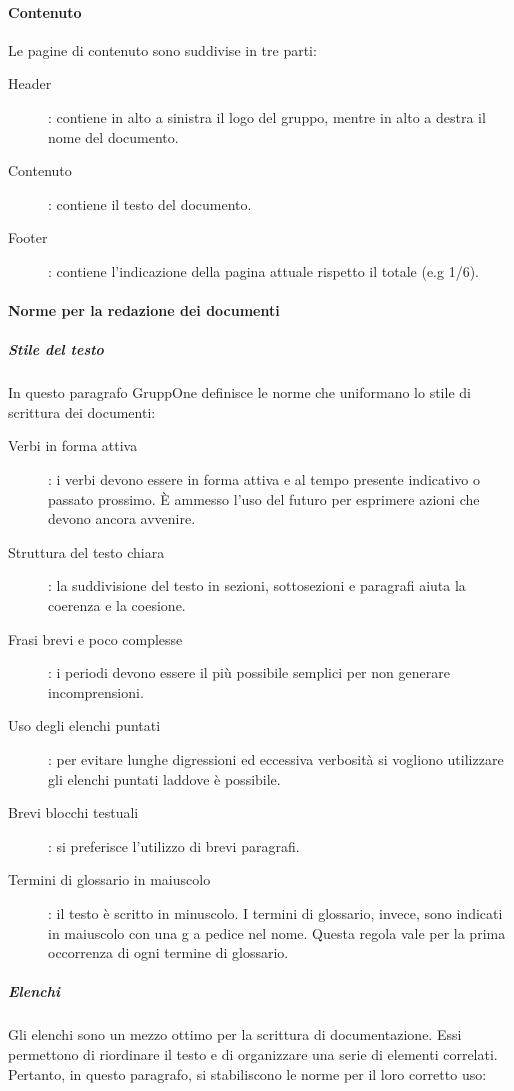 \documentclass[../norme-di-progetto.tex]{subfiles}
\begin{document}
\paragraph{Contenuto}%
\label{par:contenuto}
Le pagine di contenuto sono suddivise in tre parti:
\begin{description}
  \item [Header]: contiene in alto a sinistra il logo del gruppo, mentre in alto a destra il nome del documento.
  \item [Contenuto]: contiene il testo del documento.
  \item [Footer]: contiene l'indicazione della pagina attuale rispetto il totale (e.g 1/6).
\end{description}

\paragraph{Norme per la redazione dei documenti}%
\label{par:norme_per_la_redazione_dei_documenti}

\subparagraph{Stile del testo}%
\label{subp:stile_del_testo}
In questo paragrafo GruppOne definisce le norme che uniformano lo stile di scrittura dei documenti:
\begin{description}
    \item [Verbi in forma attiva]: i verbi devono essere in forma attiva e al tempo presente indicativo o passato prossimo. È ammesso l'uso del futuro per esprimere azioni che devono ancora avvenire.
    \item [Struttura del testo chiara]: la suddivisione del testo in sezioni, sottosezioni e paragrafi aiuta la coerenza e la coesione.
    \item [Frasi brevi e poco complesse]: i periodi devono essere il più possibile semplici per non generare incomprensioni.
    \item [Uso degli elenchi puntati]: per evitare lunghe digressioni ed eccessiva verbosità si vogliono utilizzare gli elenchi puntati laddove è possibile.
    \item [Brevi blocchi testuali]: si preferisce l'utilizzo di brevi paragrafi.
    \item [Termini di glossario in maiuscolo]: il testo è scritto in minuscolo. I termini di glossario, invece, sono indicati in maiuscolo con una g a pedice nel nome. Questa regola vale per la prima occorrenza di ogni termine di glossario.
\end{description}

\subparagraph{Elenchi }%
\label{subp:elenchi}
Gli elenchi sono un mezzo ottimo per la scrittura di documentazione. Essi permettono di riordinare il testo e di organizzare una serie di elementi correlati. Pertanto, in questo paragrafo, si stabiliscono le norme per il loro corretto uso:
\end{document}

